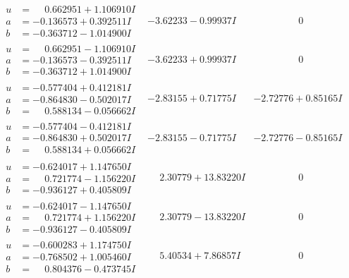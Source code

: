 \documentclass[1p]{elsarticle_modified}
\theoremstyle{definition}
\begin{document}
$$\begin{array}{c|c|c}
\begin{aligned}
u &= \phantom{-}0.662951 + 1.106910 I \\
a &= -0.136573 + 0.392511 I \\
b &= -0.363712 - 1.014900 I\end{aligned}
 & -3.62233 - 0.99937 I & \phantom{-0.000000 } 0 \\ \hline\begin{aligned}
u &= \phantom{-}0.662951 - 1.106910 I \\
a &= -0.136573 - 0.392511 I \\
b &= -0.363712 + 1.014900 I\end{aligned}
 & -3.62233 + 0.99937 I & \phantom{-0.000000 } 0 \\ \hline\begin{aligned}
u &= -0.577404 + 0.412181 I \\
a &= -0.864830 - 0.502017 I \\
b &= \phantom{-}0.588134 - 0.056662 I\end{aligned}
 & -2.83155 + 0.71775 I & -2.72776 + 0.85165 I \\ \hline\begin{aligned}
u &= -0.577404 - 0.412181 I \\
a &= -0.864830 + 0.502017 I \\
b &= \phantom{-}0.588134 + 0.056662 I\end{aligned}
 & -2.83155 - 0.71775 I & -2.72776 - 0.85165 I \\ \hline\begin{aligned}
u &= -0.624017 + 1.147650 I \\
a &= \phantom{-}0.721774 - 1.156220 I \\
b &= -0.936127 + 0.405809 I\end{aligned}
 & \phantom{-}2.30779 + 13.83220 I & \phantom{-0.000000 } 0 \\ \hline\begin{aligned}
u &= -0.624017 - 1.147650 I \\
a &= \phantom{-}0.721774 + 1.156220 I \\
b &= -0.936127 - 0.405809 I\end{aligned}
 & \phantom{-}2.30779 - 13.83220 I & \phantom{-0.000000 } 0 \\ \hline\begin{aligned}
u &= -0.600283 + 1.174750 I \\
a &= -0.768502 + 1.005460 I \\
b &= \phantom{-}0.804376 - 0.473745 I\end{aligned}
 & \phantom{-}5.40534 + 7.86857 I & \phantom{-0.000000 } 0 \\ \hline\begin{aligned}

\end{aligned}
\end{array}$$
\end{document}
